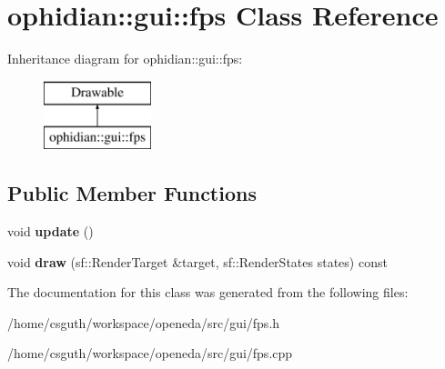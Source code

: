 \hypertarget{classophidian_1_1gui_1_1fps}{\section{ophidian\-:\-:gui\-:\-:fps Class Reference}
\label{classophidian_1_1gui_1_1fps}
}
Inheritance diagram for ophidian\-:\-:gui\-:\-:fps\-:\begin{figure}[H]
\begin{center}
\leavevmode
\includegraphics[height=2.000000cm]{classophidian_1_1gui_1_1fps}
\end{center}
\end{figure}
\subsection*{Public Member Functions}
\begin{DoxyCompactItemize}
\item 
\hypertarget{classophidian_1_1gui_1_1fps_a7339738f12b8226bcaa3459510a180e7}{void {\bfseries update} ()}\label{classophidian_1_1gui_1_1fps_a7339738f12b8226bcaa3459510a180e7}

\item 
\hypertarget{classophidian_1_1gui_1_1fps_a7b628fb3aff808c73b2d52649e5f42e9}{void {\bfseries draw} (sf\-::\-Render\-Target \&target, sf\-::\-Render\-States states) const }\label{classophidian_1_1gui_1_1fps_a7b628fb3aff808c73b2d52649e5f42e9}

\end{DoxyCompactItemize}


The documentation for this class was generated from the following files\-:\begin{DoxyCompactItemize}
\item 
/home/csguth/workspace/openeda/src/gui/fps.\-h\item 
/home/csguth/workspace/openeda/src/gui/fps.\-cpp\end{DoxyCompactItemize}
